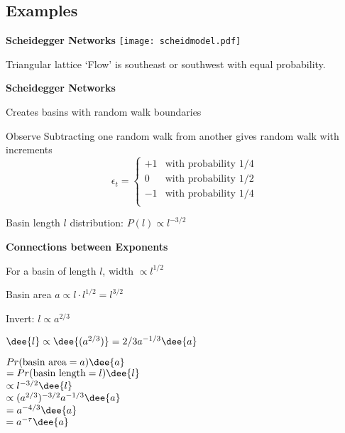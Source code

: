 {{{{{{{\begin{frame}[t]
{\begin{frame}[t]
\subsection{Examples}

  \textbf{Scheidegger Networks\cite{scheidegger1967b,dodds2000a}}
  \texttt{[image: scheidmodel.pdf]}
  
   Triangular lattice
   `Flow' is southeast or southwest with equal probability.
  


  \textbf{Scheidegger Networks}

  
   
    Creates basins with random walk boundaries
   
    \alert{Observe} Subtracting one random walk from another
    gives random walk with increments
    $$
    \epsilon_t = 
    \left\{
      \begin{array}{cl}
        +1 & \mbox{with probability $1/4$} \\
        0 & \mbox{with probability $1/2$} \\
        -1 & \mbox{with probability $1/4$} \\
      \end{array}
    \right.
    $$
   
    Basin length $l$ distribution: $P(l) \propto l^{-3/2}$
  
  


  \textbf{Connections between Exponents}

  
      
    For a basin of length $l$, width $\propto l^{1/2}$
      
    Basin area $a \propto l\cdot l^{1/2} = l^{3/2}$
      
    Invert: $ l \propto a^{2/3} $
      
    $ \dee{l} \propto \dee{(a^{2/3})} = 2/3 a^{-1/3} \dee{a} $
     
    \alert{$
    Pr(\mbox{basin area} = a) \dee{a}
    $}\\
    $
    =
    Pr(\mbox{basin length} = l) \dee{l}
    $\\
    {
      $
      \propto
      l^{-3/2} \dee{l} 
      $\\}
    {
      $
      \propto
      (a^{2/3})^{-3/2} a^{-1/3} \dee{a} 
      $\\}
    {
      $
      =
      a^{-4/3} \dee{a} 
      $\\}
    {
      \alert{$
      =
      a^{-\tau} \dee{a}
      $}\\}
  



\end{frame}}
\end{frame}}}}}}}}
